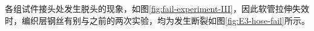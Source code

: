各组试件接头处发生脱头的现象，如图\ref{fig:fail-experiment-III}，因此软管拉伸失效时，编织层钢丝有别与之前的两次实验，均为发生断裂如图\ref{fig:E3-hose-fail}所示。

\begin{figure}[!htb]
	\centering
	\hspace{1cm}
	\subfigure{
}
\end{figure}
